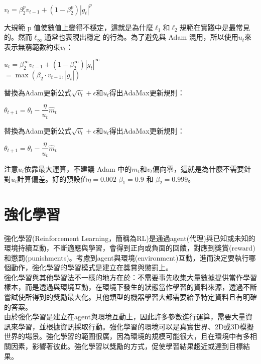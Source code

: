 \begin{itemize}
\begin{center}
$v_t = \beta_2^p v_{t-1} + (1 - \beta_2^p) |g_t|^p$
\end{center}
大規範 p 值使數值上變得不穩定，這就是為什麼$\ell_1$和$\ell_2$規範在實踐中是最常見的。然而$\ell_\infty$通常也表現出穩定 的行為。為了避免與 Adam 混用，所以使用$u_t$來表示無窮範數約束$v_t$：
\begin{center}
$u_t = \beta_2^\infty v_{t-1} + (1 - \beta_2^\infty) |g_t|^\infty$\\
$= \max(\beta_2 \cdot v_{t-1}, |g_t|)$
\end{center}
替換為Adam更新公式$\sqrt{\hat{v}_t} + \epsilon$和$u_t$得出AdaMax更新規則：
\begin{center}
$\theta_{t+1} = \theta_{t} - \dfrac{\eta}{u_t} \hat{m}_t$
\end{center}
替換為Adam更新公式$\sqrt{\hat{v}_t} + \epsilon$和$u_t$得出AdaMax更新規則：
\begin{center}
$\theta_{t+1} = \theta_{t} - \dfrac{\eta}{u_t} \hat{m}_t$
\end{center}
注意$u_t$依靠最大運算，不建議 Adam 中的$m_t$和$v_t$偏向零，這就是為什麼不需要針對$u_t$計算偏差。好的預設值$\eta = 0.002$ $\beta_1 = 0.9$ 和 $\beta_2 = 0.999$。\\
\end{itemize}


\section{強化學習}
強化學習(Reinforcement Learning，簡稱為RL)是通過agent(代理)與已知或未知的環境持續互動，不斷適應與學習，會得到正向或負面的回饋，對應到獎賞(reward)和懲罰(punishments)。考慮到agent與環境(environment)互動，進而決定要執行哪個動作，強化學習的學習模式是建立在獎賞與懲罰上。\\

強化學習與其他學習法不一樣的地方在於：不需要事先收集大量數據提供當作學習樣本，而是透過與環境互動，在環境下發生的狀態當作學習的資料來源，透過不斷嘗試使所得到的獎勵最大化。其他類型的機器學習大都需要給予特定資料且有明確的答案。\\

由於強化學習是建立在agent與環境互動上，因此許多參數進行運算，需要大量資訊來學習，並根據資訊採取行動。強化學習的環境可以是真實世界、2D或3D模擬世界的場景。強化學習的範圍很廣，因為環境的規模可能很大，且在環境中有多相關因素，影響著彼此。強化學習以獎勵的方式，促使學習結果趨近或達到目標結果。\\

